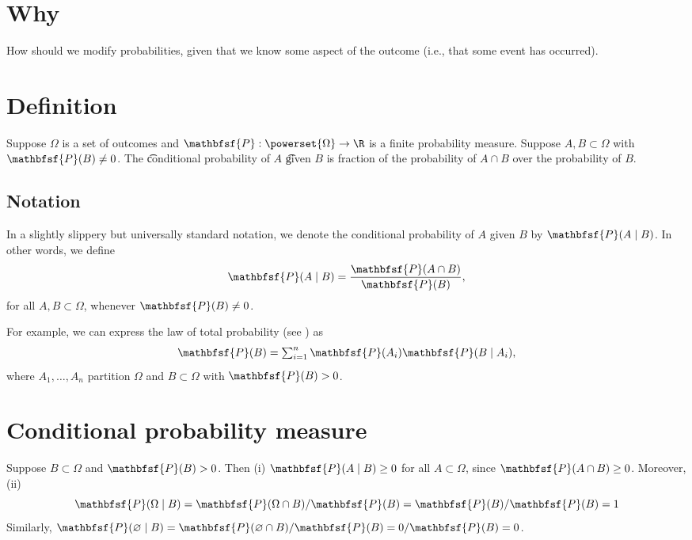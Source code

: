 

\section*{Why}

How should we modify probabilities, given that we know some aspect of the outcome (i.e., that some event has occurred).

\section*{Definition}

Suppose $\Omega $ is a set of outcomes and $\mathbfsf{P} : \powerset{\Omega } \to \R $ is a finite probability measure.
Suppose $A, B \subset \Omega $ with $\mathbfsf{P} (B) \neq 0$.
The \t{conditional probability} of $A$ \t{given} $B$ is fraction of the probability of $A \cap  B$ over the probability of $B$.

\subsection*{Notation}

In a slightly slippery but universally standard notation, we denote the conditional probability of $A$ given $B$ by $\mathbfsf{P} (A \mid  B)$.
In other words, we define
    \[
\mathbfsf{P} (A \mid  B) = \frac{\mathbfsf{P} (A \cap B)}{\mathbfsf{P} (B)},
    \]
for all $A, B \subset \Omega $, whenever $\mathbfsf{P} (B) \neq 0$.

For example, we can express the law of total probability (see ) as
    \[
\textstyle
\mathbfsf{P} (B) = \sum_{i = 1}^{n} \mathbfsf{P} (A_i)\mathbfsf{P} (B \mid  A_i),
    \]
where $A_1, \dots , A_n$ partition $\Omega $ and $B \subset \Omega $ with $\mathbfsf{P} (B) > 0$.

\section*{Conditional probability measure}

Suppose $B \subset \Omega $ and $\mathbfsf{P} (B) > 0$.
Then (i) $\mathbfsf{P} (A \mid  B) \geq 0$ for all $A \subset \Omega $, since $\mathbfsf{P} (A \cap  B) \geq 0$.
Moreover, (ii)
    \[
\mathbfsf{P} (\Omega  \mid  B) = \mathbfsf{P} (\Omega  \cap B)/\mathbfsf{P} (B) = \mathbfsf{P} (B)/\mathbfsf{P} (B) = 1
    \]
Similarly, $\mathbfsf{P} (\varnothing \mid  B) = \mathbfsf{P} (\varnothing \cap  B)/\mathbfsf{P} (B) = 0/\mathbfsf{P} (B) = 0$.

